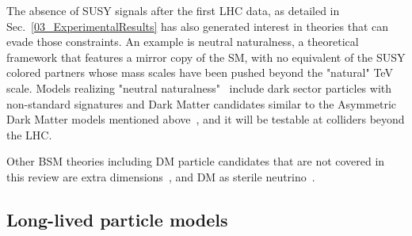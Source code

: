 \begin{marginnote}[]
\end{marginnote}


The absence of SUSY signals after the first LHC data, as detailed in Sec.~\ref{03_ExperimentalResults}
has also generated interest in theories that can evade those constraints. 
An example is neutral naturalness, a theoretical framework that features a mirror copy of the SM,
with no equivalent of the SUSY colored partners whose mass scales have been
pushed beyond the "natural" TeV scale. Models realizing "neutral naturalness"~\cite{Craig:2014aea}
include dark sector particles with non-standard signatures and Dark Matter candidates similar to the
Asymmetric Dark Matter models mentioned above~\cite{Garcia:2015toa},
and it will be testable at colliders beyond the LHC. 

Other BSM theories including DM particle candidates that are not covered in this review are
extra dimensions~\cite{Hooper:2007qk}, and DM as sterile neutrino~\cite{Adhikari:2016bei}.

\subsection{Long-lived particle models}
\label{sec:LLPModels}



